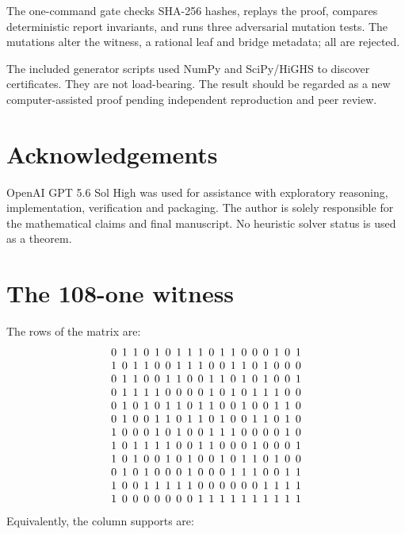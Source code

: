 \documentclass[11pt]{article}
\begin{document}
The one-command gate checks SHA-256 hashes, replays the proof, compares deterministic report invariants, and runs three adversarial mutation tests. The mutations alter the witness, a rational leaf and bridge metadata; all are rejected.

The included generator scripts used NumPy and SciPy/HiGHS to discover certificates. They are not load-bearing. The result should be regarded as a new computer-assisted proof pending independent reproduction and peer review.

\section*{Acknowledgements}
OpenAI GPT 5.6 Sol High was used for assistance with exploratory reasoning, implementation, verification and packaging. The author is solely responsible for the mathematical claims and final manuscript. No heuristic solver status is used as a theorem.

\appendix
\section{The 108-one witness}
\label{app:witness}
The rows of the matrix are:
\[
\setlength{\arraycolsep}{2.4pt}
\begin{array}{*{18}{c}}
0 & 1 & 1 & 0 & 1 & 0 & 1 & 1 & 1 & 0 & 1 & 1 & 0 & 0 & 0 & 1 & 0 & 1\\
1 & 0 & 1 & 1 & 0 & 0 & 1 & 1 & 1 & 0 & 0 & 1 & 1 & 0 & 1 & 0 & 0 & 0\\
0 & 1 & 1 & 0 & 0 & 1 & 1 & 0 & 0 & 1 & 1 & 0 & 1 & 0 & 1 & 0 & 0 & 1\\
0 & 1 & 1 & 1 & 1 & 0 & 0 & 0 & 0 & 1 & 0 & 1 & 0 & 1 & 1 & 1 & 0 & 0\\
0 & 1 & 0 & 1 & 0 & 1 & 1 & 0 & 1 & 1 & 0 & 0 & 1 & 0 & 0 & 1 & 1 & 0\\
0 & 1 & 0 & 0 & 1 & 1 & 0 & 1 & 1 & 0 & 1 & 0 & 0 & 1 & 1 & 0 & 1 & 0\\
1 & 0 & 0 & 0 & 1 & 0 & 1 & 0 & 0 & 1 & 1 & 1 & 0 & 0 & 0 & 0 & 1 & 0\\
1 & 0 & 1 & 1 & 1 & 1 & 0 & 0 & 1 & 1 & 0 & 0 & 0 & 1 & 0 & 0 & 0 & 1\\
1 & 0 & 1 & 0 & 0 & 1 & 0 & 1 & 0 & 0 & 1 & 0 & 1 & 1 & 0 & 1 & 0 & 0\\
0 & 1 & 0 & 1 & 0 & 0 & 0 & 1 & 0 & 0 & 0 & 1 & 1 & 1 & 0 & 0 & 1 & 1\\
1 & 0 & 0 & 1 & 1 & 1 & 1 & 1 & 0 & 0 & 0 & 0 & 0 & 0 & 1 & 1 & 1 & 1\\
1 & 0 & 0 & 0 & 0 & 0 & 0 & 0 & 1 & 1 & 1 & 1 & 1 & 1 & 1 & 1 & 1 & 1
\end{array}
\]
Equivalently, the column supports are:
\end{document}

